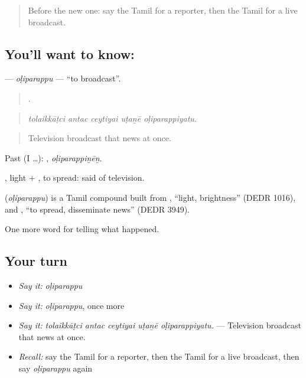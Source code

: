 \label{lesson:TA-C305-oliparappu}



\begin{quote}
Before the new one: say the Tamil for a reporter, then the Tamil for a live broadcast.
\end{quote}

\subsection*{You'll want to know: }
\textbf{} — \emph{oḷiparappu} — \textquotedblleft{}to broadcast\textquotedblright{}.

\begin{quote}
    .
\end{quote}

\begin{quote}
\emph{tolaikkāṭci antac ceytiyai uṭaṉē oḷiparappiyatu.}
\end{quote}

\begin{quote}
Television broadcast that news at once.
\end{quote}

Past (I …): , \emph{oḷiparappiṉēṉ}.

, light + , to spread: said of television.

\begin{cousinweb}
\textbf{} (\emph{oḷiparappu}) is a Tamil compound built from , \textquotedblleft{}light, brightness\textquotedblright{} (DEDR 1016), and , \textquotedblleft{}to spread, disseminate news\textquotedblright{} (DEDR 3949).
\end{cousinweb}

\begin{grammarlens}[title={What you've built}]
One more word for telling what happened.
\end{grammarlens}

\subsection*{Your turn}
\begin{itemize}
\raggedright
  \item \emph{Say it:} \emph{oḷiparappu}
  \item \emph{Say it:} \emph{oḷiparappu}, once more
  \item \emph{Say it:} \emph{tolaikkāṭci antac ceytiyai uṭaṉē oḷiparappiyatu.} — Television broadcast that news at once.
  \item \emph{Recall:} say the Tamil for a reporter, then the Tamil for a live broadcast, then say \emph{oḷiparappu} again
\end{itemize}

